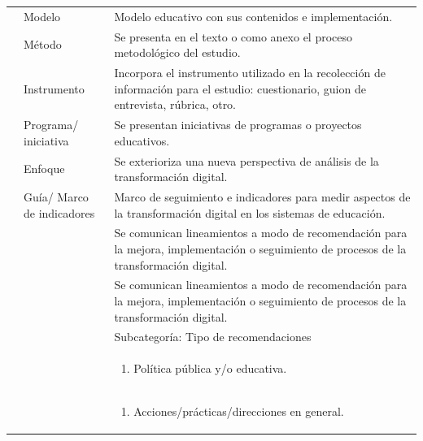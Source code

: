 \begin{longtable}{
>{\raggedright\arraybackslash}p{}
>{\raggedright\arraybackslash}p{} 
>{\raggedright\arraybackslash}p{}}
    \multirow{9}{*}{\begin{minipage}{\textwidth-0.125\textwidth-0.65\textwidth} Tipo de aporte\end{minipage}} & Modelo & Modelo educativo con
    sus contenidos e implementación. \\
    & Método & Se presenta en el texto o como anexo el proceso metodológico
    del estudio. \\
    & Instrumento & Incorpora el instrumento utilizado en la recolección de
    información para el estudio: cuestionario, guion de entrevista, rúbrica,
    otro. \\
    & Programa/ iniciativa & Se presentan iniciativas de programas o
    proyectos educativos. \\
    & Enfoque & Se exterioriza una nueva perspectiva de análisis de la
    transformación digital. \\
    & Guía/ Marco de indicadores & Marco de seguimiento e indicadores para medir
    aspectos de la transformación digital en los sistemas de educación. \\
    
    & \multirow{3}{*}{\begin{minipage}{0.125\textwidth} Recomendaciones \end{minipage}} & Se comunican lineamientos a modo de recomendación
    para la mejora, implementación o seguimiento de procesos de la
    transformación digital. \\
    & & Se comunican lineamientos a modo de recomendación para la mejora, implementación o seguimiento de procesos de la transformación digital. \\
    && Subcategoría: Tipo de recomendaciones \\
    && \begin{enumerate}
        \def\labelenumi{\alph{enumi})}
        \item Política pública y/o educativa.
    \end{enumerate} \\
    && \begin{enumerate}
        \def\labelenumi{\alph{enumi})}
        \setcounter{enumi}{1}
        \item Acciones/prácticas/direcciones en general.
    \end{enumerate} \\
    

\end{longtable}
